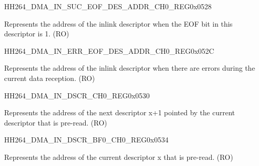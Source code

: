     
    \begin{register}{H}{H264\_DMA\_IN\_SUC\_EOF\_DES\_ADDR\_CH0\_REG}{0x0528}\label{regdesc:H264DMAINSUCEOFDESADDRCH0REG}
    \regnewline%
    \begin{regdesc}\begin{reglist}
    \label{fielddesc:H264DMAINSUCEOFDESADDRCH0}\item [H264\_DMA\_IN\_SUC\_EOF\_DES\_ADDR\_CH0] Represents the address of the inlink descriptor when the EOF bit in this descriptor is 1. (RO)
    \end{reglist}\end{regdesc}
    \end{register}
    
    
    \begin{register}{H}{H264\_DMA\_IN\_ERR\_EOF\_DES\_ADDR\_CH0\_REG}{0x052C}\label{regdesc:H264DMAINERREOFDESADDRCH0REG}
    \regnewline%
    \begin{regdesc}\begin{reglist}
    \label{fielddesc:H264DMAINERREOFDESADDRCH0}\item [H264\_DMA\_IN\_ERR\_EOF\_DES\_ADDR\_CH0] Represents the address of the inlink descriptor when there are errors during the current data reception. (RO)
    \end{reglist}\end{regdesc}
    \end{register}
    
    
    \begin{register}{H}{H264\_DMA\_IN\_DSCR\_CH0\_REG}{0x0530}\label{regdesc:H264DMAINDSCRCH0REG}
    \regnewline%
    \begin{regdesc}\begin{reglist}
    \label{fielddesc:H264DMAINLINKDSCRCH0}\item [H264\_DMA\_INLINK\_DSCR\_CH0] Represents the address of the next descriptor x+1 pointed by the current descriptor that is pre-read. (RO)
    \end{reglist}\end{regdesc}
    \end{register}
    
    
    \begin{register}{H}{H264\_DMA\_IN\_DSCR\_BF0\_CH0\_REG}{0x0534}\label{regdesc:H264DMAINDSCRBF0CH0REG}
    \regnewline%
    \begin{regdesc}\begin{reglist}
    \label{fielddesc:H264DMAINLINKDSCRBF0CH0}\item [H264\_DMA\_INLINK\_DSCR\_BF0\_CH0] Represents the address of the current descriptor x that is pre-read. (RO)
    \end{reglist}\end{regdesc}
    \end{register}
    
